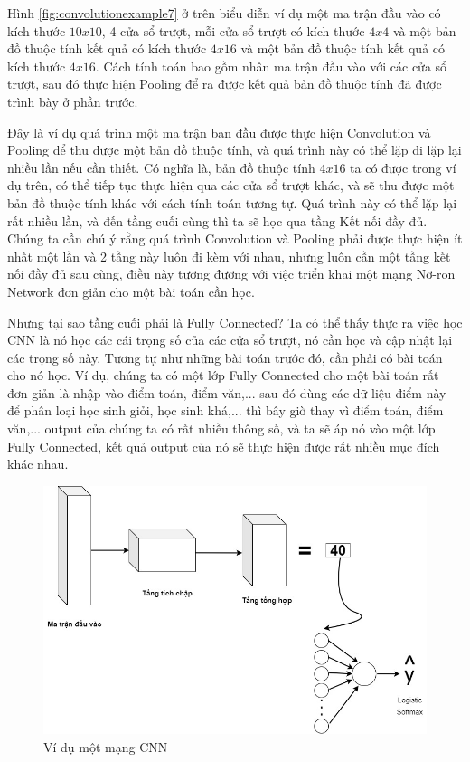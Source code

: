Hình \ref{fig:convolutionexample7} ở trên biểu diễn ví dụ một ma trận đầu vào có kích thước $10x10$, 4 cửa sổ trượt, mỗi cửa sổ trượt có kích thước $4x4$ và một bản đồ thuộc tính kết quả có kích thước $4x16$ và một bản đồ thuộc tính kết quả có kích thước $4x16$. Cách tính toán bao gồm nhân ma trận đầu vào với các cửa sổ trượt, sau đó thực hiện Pooling để ra được kết quả bản đồ thuộc tính đã được trình bày ở phần trước.

Đây là ví dụ quá trình một ma trận ban đầu được thực hiện Convolution và Pooling để thu được một bản đồ thuộc tính, và quá trình này có thể lặp đi lặp lại nhiều lần nếu cần thiết. Có nghĩa là, bản đồ thuộc tính $4x16$ ta có được trong ví dụ trên, có thể tiếp tục thực hiện qua các cửa sổ trượt khác, và sẽ thu được một bản đồ thuộc tính khác với cách tính toán tương tự. Quá trình này có thể lặp lại rất nhiều lần, và đến tầng cuối cùng thì ta sẽ học qua tầng Kết nối đầy đủ. Chúng ta cần chú ý rằng quá trình Convolution và Pooling phải được thực hiện ít nhất một lần và 2 tầng này luôn đi kèm với nhau, nhưng luôn cần một tầng kết nối đầy đủ sau cùng, điều này tương đương với việc triển khai một mạng Nơ-ron Network đơn giản cho một bài toán cần học.

Nhưng tại sao tầng cuối phải là Fully Connected? Ta có thể thấy thực ra việc học CNN là nó học các cái trọng số của các cửa sổ trượt, nó cần học và cập nhật lại các trọng số này. Tương tự như những bài toán trước đó, cần phải có bài toán cho nó học. Ví dụ, chúng ta có một lớp Fully Connected cho một bài toán rất đơn giản là nhập vào điểm toán, điểm văn,... sau đó dùng các dữ liệu điểm này để phân loại học sinh giỏi, học sinh khá,... thì bây giờ thay vì điểm toán, điểm văn,... output của chúng ta có rất nhiều thông số, và ta sẽ áp nó vào một lớp Fully Connected, kết quả output của nó sẽ thực hiện được rất nhiều mục đích khác nhau.

\begin{figure}[!h]
	\centering
		\includegraphics[width=1\columnwidth]{books/artificial-neural-network/chapter05/figure/convolution-example-5.jpg}
        \caption{Ví dụ một mạng CNN}
        \label{fig:convolutionexample5}
\end{figure}

